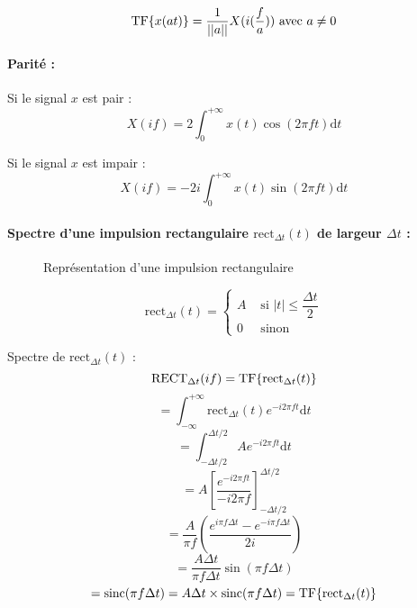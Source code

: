 \documentclass[a4paper,12pt]{report}
\begin{document}
\[ \mathrm{TF} \{  x(at) \} = \dfrac{1}{||a||} X(i(\dfrac{f}{a})) \text{ avec } a \neq 0 \]

\paragraph{Parité :}

Si le signal $x$ est pair :
\[ X(if) = 2 \int_{0}^{+\infty} x(t) \cos(2\pi ft) \mathrm{d}t \]

Si le signal $x$ est impair :
\[ X(if) = -2i \int_{0}^{+\infty} x(t) \sin(2\pi ft) \mathrm{d}t \]

\paragraph{Spectre d'une impulsion rectangulaire $\mathrm{rect}_{\Delta t}(t)$ de largeur $\Delta t$ :}

\begin{figure}[!htbp]
	\centering
	\caption{Représentation d'une impulsion rectangulaire}
\end{figure}

\[ \mathrm{rect}_{\Delta t}(t) =
\begin{cases}
    A & \text{ si } |t| \leq \dfrac{\Delta t}{2} \\
    0 & \text{ sinon}
\end{cases} \]

Spectre de $\mathrm{rect}_{\Delta t}(t)$ :
\[ \mathrm{RECT}_{\Delta t}(if) = \mathrm{TF} \{  \mathrm{rect}_{\Delta t}(t) \} \]
\[ = \int_{-\infty}^{+\infty} \mathrm{rect}_{\Delta t}(t) e^{-i2\pi ft} \mathrm{d}t \]
\[ = \int_{-\Delta t / 2}^{\Delta t / 2} A e^{-i2\pi ft} \mathrm{d}t \]
\[ = A[\dfrac{e^{-i2\pi ft}}{-i2\pi f}]_{-\Delta t / 2}^{\Delta t / 2} \]
\[ = \dfrac{A}{\pi f} (\dfrac{e^{i\pi f\Delta t} - e^{-i\pi f\Delta t}}{2i}) \]
\[ = \dfrac{A\Delta t}{\pi f \Delta t} \sin(\pi f\Delta t) \]
\[ = \mathrm{sinc}(\pi f\Delta t) = A\Delta t \times \mathrm{sinc}(\pi f\Delta t) = \mathrm{TF} \{  \mathrm{rect}_{\Delta t}(t) \} \]
\end{document}
